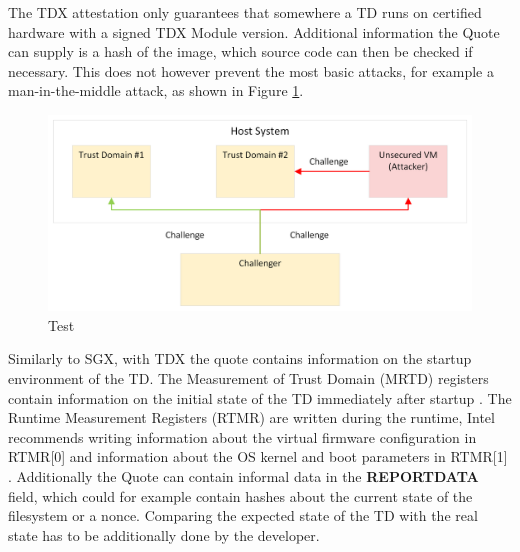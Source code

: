 The TDX attestation only guarantees that somewhere a TD runs on certified hardware with a signed TDX Module version. Additional information the Quote can supply is a hash of the image, which source code can then be checked if necessary. This does not however prevent the most basic attacks, for example a man-in-the-middle attack, as shown in Figure \ref{fig:man_in_the_middle}.
\begin{figure}
   \centering
       \includegraphics[width=.75\textwidth]{figures/Man-In-The-Middle.png} 
 \caption{Test}
 \label{fig:man_in_the_middle}
\end{figure}

\label{Identity}
Similarly to SGX, with TDX the quote contains information on the startup environment of the TD. The Measurement of Trust Domain (MRTD) registers contain information on the initial state of the TD immediately after startup \cite{DCAP}. The Runtime Measurement Registers (RTMR) are written during the runtime, Intel recommends writing information about the virtual firmware configuration in RTMR[0] and information about the OS kernel and boot parameters in RTMR[1] . Additionally the Quote can contain informal data in the \textbf{REPORTDATA} field, which could for example contain hashes about the current state of the filesystem or a nonce. Comparing the expected state of the TD with the real state has to be additionally done by the developer.  

